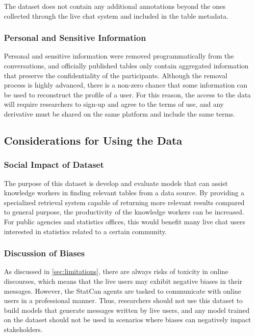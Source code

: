 \documentclass[11pt]{article}
\begin{document}
The dataset does not contain any additional annotations beyond the ones collected through the live chat system and included in the table metadata.

\subsubsection{Personal and Sensitive Information}

Personal and sensitive information were removed programmatically from the conversations, and officially published tables only contain aggregated information that preserve the confidentiality of the participants. Although the removal process is highly advanced, there is a non-zero chance that some information can be used to reconstruct the profile of a user. For this reason, the access to the data will require researchers to sign-up and agree to the terms of use, and any derivative must be shared on the same platform and include the same terms.

\subsection{Considerations for Using the Data}

\subsubsection{Social Impact of Dataset}

The purpose of this dataset is develop and evaluate models that can assist knowledge workers in finding relevant tables from a data source. By providing a specialized retrieval system capable of returning more relevant results compared to general purpose, the productivity of the knowledge workers can be increased. For public agencies and statistics offices, this would benefit many live chat users interested in statistics related to a certain community.

\subsubsection{Discussion of Biases}

As discussed in \autoref{sec:limitations}, there are always risks of toxicity in online discourses, which means that the live users may exhibit negative biases in their messages. However, the StatCan agents are tasked to communicate with online users in a professional manner. Thus, researchers should not use this dataset to build models that generate messages written by live users, and any model trained on the dataset should not be used in scenarios where biases can negatively impact stakeholders.
\end{document}
